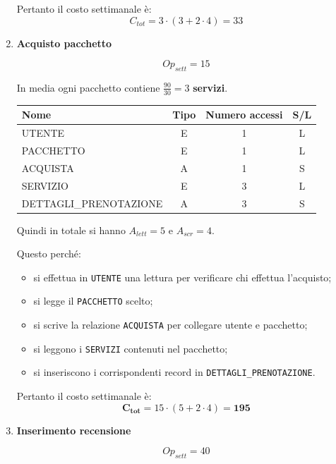 \documentclass[a4paper,12pt]{report}
\begin{document}
\begin{enumerate}
  	Pertanto il costo settimanale è:
    $$
    C_{tot} = 3 \cdot (3 + 2 \cdot 4) = 33
    $$
    
    \item {\large \textbf{Acquisto pacchetto}} \label{op6}

    $$
    {Op}_{sett} = 15
    $$

	In media ogni pacchetto contiene $\frac{90}{30}=3$ \textbf{servizi}.

    \begin{table}[H]
    \centering
    \small
    \renewcommand{\arraystretch}{1.15}
    \begin{tabularx}{0.85\textwidth}{|X|c|c|c|}
        \hline
        \rowcolor{gray!20}
        \textbf{Nome} & \textbf{Tipo} & \textbf{Numero accessi} & \textbf{S/L} \\
        \hline
        UTENTE & E & 1 & L \\
        PACCHETTO & E & 1 & L \\
        ACQUISTA & A & 1 & S \\
        SERVIZIO & E & 3 & L \\
        DETTAGLI\_PRENOTAZIONE & A & 3 & S \\
        \hline
    \end{tabularx}
    \end{table}

    Quindi in totale si hanno $A_{lett}=5$ e $A_{scr}=4$.

    Questo perché:
    \begin{itemize}
    \item si effettua in \texttt{UTENTE} una lettura per verificare chi effettua l’acquisto;
    \item si legge il \texttt{PACCHETTO} scelto;
    \item si scrive la relazione \texttt{ACQUISTA} per collegare utente e pacchetto;
    \item si leggono i \texttt{SERVIZI} contenuti nel pacchetto;
    \item si inseriscono i corrispondenti record in \texttt{DETTAGLI\_PRENOTAZIONE}.
    \end{itemize}

    Pertanto il costo settimanale è:
    \[
    \mathbf{C_{tot}} = 15 \cdot (5 + 2 \cdot 4) = \mathbf{195}
    \]

    
	\item {\large \textbf{Inserimento recensione}} \label{op7}
	
    $$
    {Op}_{sett} = 40
    $$


\end{enumerate}
\end{document}
